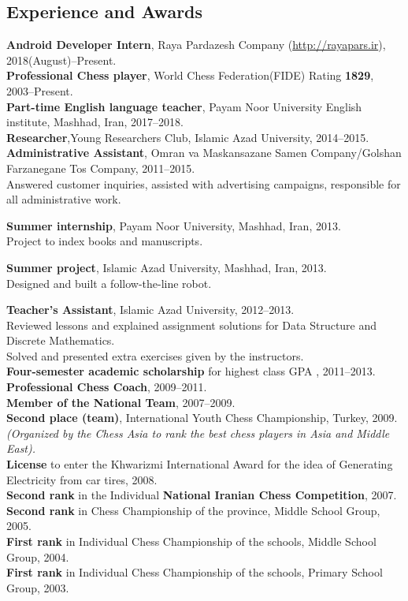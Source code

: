 \documentclass[10pt]{article}
\begin{document}
\subsection*{Experience and Awards}
\textbf {Android Developer Intern}, Raya Pardazesh Company (\url{http://rayapars.ir}), 2018(August)--Present.\\
\noindent\textbf {Professional Chess player},  World Chess Federation(FIDE) Rating\textbf{ 1829}, 2003--Present.\\
\textbf {Part-time English language teacher}, Payam Noor University English institute, Mashhad, Iran, 2017--2018.\\
\noindent\textbf {Researcher},Young Researchers Club, Islamic Azad University, 2014--2015.\\
\noindent\textbf{Administrative Assistant}, Omran va Maskansazane Samen Company/Golshan Farzanegane Tos Company, 2011--2015.\\
\indent Answered customer inquiries, assisted with advertising campaigns, responsible for all administrative work.

\noindent\textbf{Summer internship}, Payam Noor University, Mashhad, Iran, 2013.\\
\indent Project to index books and manuscripts.

\noindent\textbf{Summer project}, Islamic Azad University, Mashhad, Iran, 2013.\\
\indent Designed and built a follow-the-line robot.

\noindent\textbf{Teacher’s Assistant}, Islamic Azad University, 2012--2013.\\
\indent Reviewed lessons and explained assignment solutions for Data Structure and Discrete Mathematics.\\
\indent Solved and presented extra exercises given by the instructors.\\
\textbf{Four-semester academic scholarship} for highest class GPA , 2011--2013.\\
\noindent\textbf {Professional Chess Coach}, 2009--2011.\\
\noindent\textbf {Member of the National Team}, 2007--2009.\\
\textbf{Second place (team)}, International Youth Chess Championship, Turkey, 2009.\\ \indent \textit {(Organized by the Chess Asia to rank the best chess players in Asia and Middle East).} \\
\noindent\textbf {License }to enter the Khwarizmi International Award for the idea of Generating Electricity from car tires, 2008.\\
\textbf{Second rank} in the Individual \textbf{National Iranian Chess Competition}, 2007.\\
\textbf{Second rank} in Chess Championship of the province, Middle School Group, 2005.\\
\textbf{First rank} in Individual Chess Championship of the schools, Middle School Group, 2004.\\
\textbf{First rank} in Individual Chess Championship of the schools, Primary School Group, 2003.
\end{document}
